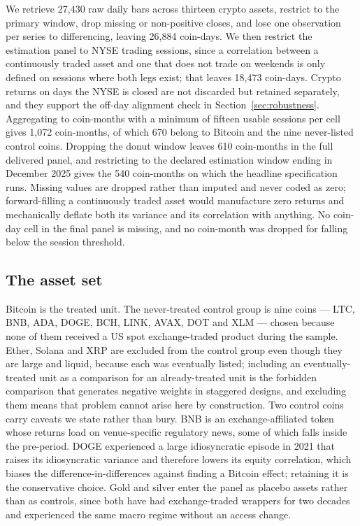 \documentclass[12pt,a4paper]{article}
\begin{document}
We retrieve
27{,}430 raw daily bars across thirteen crypto assets, restrict to the primary window, drop missing or non-positive closes, and lose one observation per series to differencing, leaving
26{,}884 coin-days. We then restrict the estimation panel to NYSE trading sessions, since a correlation between a continuously traded asset and one that does not trade on weekends is only defined on sessions where both legs exist; that leaves
18{,}473 coin-days. Crypto returns on days the NYSE is closed are not discarded but retained separately, and they support the off-day alignment check in Section~\ref{sec:robustness}. Aggregating to coin-months with a minimum of fifteen usable sessions per cell gives
1{,}072 coin-months, of which
670 belong to Bitcoin and the nine never-listed control coins. Dropping the donut window leaves
610 coin-months in the full delivered panel, and restricting to the declared estimation window ending in December 2025 gives the
540 coin-months on which the headline specification runs. Missing values are dropped rather than imputed and never coded as zero; forward-filling a continuously traded asset would manufacture zero returns and mechanically deflate both its variance and its correlation with anything.
No coin-day cell in the final panel is missing, and no coin-month was dropped for falling below the session threshold.

\subsection{The asset set}

Bitcoin is the treated unit. The never-treated control group is nine coins — LTC, BNB, ADA, DOGE, BCH, LINK, AVAX, DOT and XLM — chosen because none of them received a US spot exchange-traded product during the sample. Ether, Solana and XRP are excluded from the control group even though they are large and liquid, because each was eventually listed; including an eventually-treated unit as a comparison for an already-treated unit is the forbidden comparison that generates negative weights in staggered designs, and excluding them means that problem cannot arise here by construction. Two control coins carry caveats we state rather than bury. BNB is an exchange-affiliated token whose returns load on venue-specific regulatory news, some of which falls inside the pre-period. DOGE experienced a large idiosyncratic episode in 2021 that raises its idiosyncratic variance and therefore lowers its equity correlation, which biases the difference-in-differences against finding a Bitcoin effect; retaining it is the conservative choice. Gold and silver enter the panel as placebo assets rather than as controls, since both have had exchange-traded wrappers for two decades and experienced the same macro regime without an access change.
\end{document}
